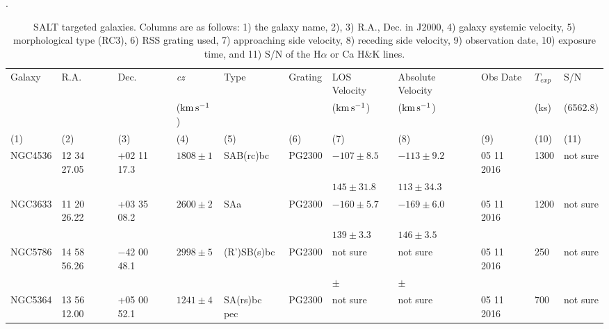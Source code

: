 \documentclass[iop]{emulateapj-rtx4}
\newcommand{\kms}{$\rm km\, s^{-1}$}
\begin{document}
\begin{table}[ht]\footnotesize. 
\begin{center}
\begin{tabular}{l l l l l l l l l l l}
 \hline \hline
  Galaxy 		& R.A. 		& Dec. 		 	& \textit{cz}	& Type		& Grating		& LOS Velocity		& Absolute Velocity	& Obs Date	& $T_{exp}$		& S/N			\\ 
  	    		& 	       		&	  		 	& (\kms)		& 		  	&			& (\kms)		     	& (\kms)			&			& (ks)			& (6562.8)			\\ 
 \scriptsize (1)  	& \scriptsize (2)	& \scriptsize (3) 	&\scriptsize (4)	& \scriptsize (5)	& \scriptsize (6)	& \scriptsize (7)		& \scriptsize (8)		& \scriptsize (9)	& \scriptsize (10)	& \scriptsize (11)	\\ \hline \hline
 
 NGC4536	& 12 34 27.05	& +02 11 17.3		& $1808 \pm1$	& SAB(rc)bc	& PG2300		& $-107 \pm 8.5$	& $-113 \pm 9.2$	& 05 11 2016	& 1300			& not sure \\
  			&			&				&			&			&			& $145 \pm 31.8$	& $113 \pm 34.3$	&			&				&		\\
			
 NGC3633	& 11 20 26.22	& +03 35 08.2		& $2600 \pm2$	& SAa		& PG2300		& $-160 \pm 5.7$	& $-169 \pm 6.0$	& 05 11 2016	& 1200			& not sure \\
 			&			&				&			&			&			& $139 \pm 3.3$	& $146 \pm 3.5$	&			&				&		\\
			
 NGC5786	& 14 58 56.26	& $-$42 00 48.1	& $2998 \pm5$	& (R')SB(s)bc	& PG2300		& not sure			& not sure			& 05 11 2016	& 250			& not sure \\
  			&			&				&			&			&			& $ \pm $	& $ \pm $	&			&				&		\\

 NGC5364	& 13 56 12.00	& +05 00 52.1		& $1241 \pm4$	& SA(rs)bc pec	& PG2300		& not sure			& not sure			& 05 11 2016	& 700			& not sure \\
 	
 
 
 \hline

\end{tabular}
\end{center}
  \caption{\small{SALT targeted galaxies. Columns are as follows: 1) the galaxy name, 2), 3) R.A., Dec. in J2000, 4) galaxy systemic velocity, 5) morphological type (RC3), 6) RSS grating used, 7) approaching side velocity, 8) receding side velocity, 9) observation date, 10) exposure time, and 11) S/N of the H$\alpha$ or Ca H\&K lines.}}
  \label{salt_targets}
\end{table}
\end{document}
